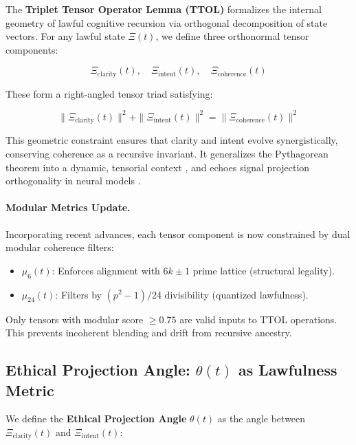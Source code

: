 \documentclass[12pt]{article}
\begin{document}
The \textbf{Triplet Tensor Operator Lemma (TTOL)} formalizes the internal geometry of lawful cognitive recursion via orthogonal decomposition of state vectors. For any lawful state $\Xi(t)$, we define three orthonormal tensor components:

\begin{equation}
\Xi_{\text{clarity}}(t), \quad \Xi_{\text{intent}}(t), \quad \Xi_{\text{coherence}}(t)
\end{equation}

These form a right-angled tensor triad satisfying:

\begin{equation}
\| \Xi_{\text{clarity}}(t) \|^2 + \| \Xi_{\text{intent}}(t) \|^2 = \| \Xi_{\text{coherence}}(t) \|^2
\end{equation}

This geometric constraint ensures that clarity and intent evolve synergistically, conserving coherence as a recursive invariant. It generalizes the Pythagorean theorem into a dynamic, tensorial context \cite{arnold1989mathematical}, and echoes signal projection orthogonality in neural models \cite{olshausen1996emergence}.

\paragraph{Modular Metrics Update.}
Incorporating recent advances, each tensor component is now constrained by dual modular coherence filters:

\begin{itemize}
    \item $\mu_6(t)$: Enforces alignment with $6k \pm 1$ prime lattice (structural legality).
    \item $\mu_{24}(t)$: Filters by $(p^2 - 1)/24$ divisibility (quantized lawfulness).
\end{itemize}

Only tensors with modular score $\geq 0.75$ are valid inputs to TTOL operations. This prevents incoherent blending and drift from recursive ancestry.

\subsection{Ethical Projection Angle: $\theta(t)$ as Lawfulness Metric}

We define the \textbf{Ethical Projection Angle} $\theta(t)$ as the angle between $\Xi_{\text{clarity}}(t)$ and $\Xi_{\text{intent}}(t)$:
\end{document}
